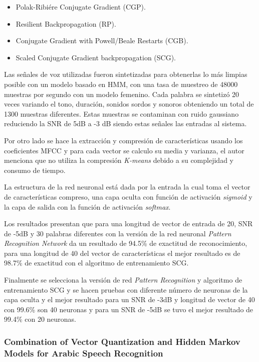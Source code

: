 	\begin{itemize}
	\item	Polak-Ribiére Conjugate Gradient (CGP).
	\item	Resilient Backpropagation (RP).
	\item	Conjugate Gradient with Powell/Beale Restarts (CGB).
	\item	Scaled Conjugate Gradient backpropagation (SCG).
	\end{itemize}
	
	Las señales de voz utilizadas fueron sintetizadas para obtenerlas lo más limpias posible con un modelo basado en HMM, con una tasa de muestreo de 48000 muestras por segundo con un modelo femenino. Cada palabra se sintetizó 20 veces variando el tono, duración, sonidos sordos y sonoros obteniendo un total de 1300 muestras diferentes. Estas muestras se contaminan con ruido gaussiano reduciendo la SNR de 5dB a -3 dB siendo estas señales las entradas al sistema.
	
	Por otro lado se hace la extracción y compresión de características usando los coeficientes MFCC y para cada vector se calculo su media y varianza, el autor menciona que no utiliza la compresión \textit{K-means} debido a su complejidad y consumo de tiempo.
	
	La estructura de la red neuronal está dada por la entrada la cual toma el vector de características compreso, una capa oculta con función de activación \textit{sigmoid} y la capa de salida con la función de activación \textit{softmax}.
	
	Los resultados presentan que para una longitud de vector de entrada de 20, SNR de -5dB y 30 palabras diferentes con la versión de la red neuronal \textit{Pattern Recognition Network} da un resultado de 94.5\% de exactitud de reconocimiento, para una longitud de 40 del vector de características el mejor resultado es de 98.7\% de exactitud con el algoritmo de entrenamiento SCG.
	
	Finalmente se selecciona la versión de red \textit{Pattern Recognition} y algoritmo de entrenamiento SCG y se hacen pruebas con diferente número de neuronas de la capa oculta y el mejor resultado para un SNR de -3dB y longitud de vector de 40 con 99.6\% son 40 neuronas y para un SNR de -5dB se tuvo el mejor resultado de 99.4\% con 20 neuronas.
	
	\subsubsection*{Combination of Vector Quantization and Hidden Markov Models for Arabic Speech Recognition \cite{A6}}\label{sub:sota:A6}
	
